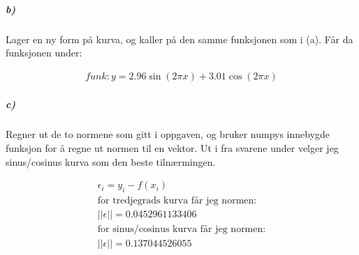 \documentclass[11pt, A4paper,norsk]{article}
\begin{document}
			\subparagraph{b)}
				\begin{flushleft}
Lager en ny form på kurva, og kaller på den samme funksjonen som i (a). Får da funksjonen under:
				\end{flushleft}
				\begin{align*}
funk: y = 2.96 \sin(2 \pi x) + 3.01 \cos(2\pi x)
				\end{align*}











			\subparagraph{c)}
				\begin{flushleft}
Regner ut de to normene som gitt i oppgaven, og bruker numpys innebygde funksjon for å regne ut normen til en vektor. Ut i fra svarene under velger jeg sinus/cosinus kurva som den beste tilnærmingen.
				\end{flushleft}
				\begin{align}
\epsilon_i = y_i - f(x_i) \nonumber \\
\text{for tredjegrads kurva får jeg normen:} \nonumber \\
|| \epsilon || = 0.0452961133406 \nonumber \\
\text{for sinus/cosinus kurva får jeg normen:} \nonumber \\
|| \epsilon || = 0.137044526055 \nonumber
				\end{align}
\end{document}
